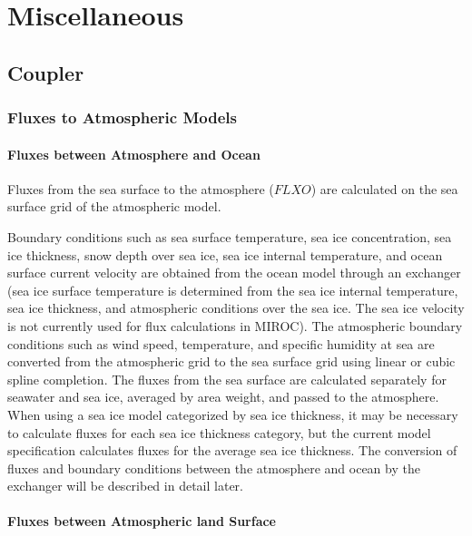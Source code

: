 \hypertarget{miscellaneous}{%
\section{Miscellaneous}\label{miscellaneous}}

\hypertarget{coupler}{%
\subsection{Coupler}\label{coupler}}

\hypertarget{fluxes-to-atmospheric-models}{%
\subsubsection{Fluxes to Atmospheric Models}\label{fluxes-to-atmospheric-models}}

\hypertarget{fluxes-between-atmosphere-and-ocean}{%
\paragraph{Fluxes between Atmosphere and Ocean}\label{fluxes-between-atmosphere-and-ocean}}

Fluxes from the sea surface to the atmosphere (\(FLXO\)) are calculated on the sea surface grid of the atmospheric model.

Boundary conditions such as sea surface temperature, sea ice concentration, sea ice thickness, snow depth over sea ice, sea ice internal temperature, and ocean surface current velocity are obtained
from the ocean model through an exchanger (sea ice surface temperature is determined from the sea ice internal temperature, sea ice thickness, and atmospheric conditions over the sea ice. The sea ice
velocity is not currently used for flux calculations in MIROC). The atmospheric boundary conditions such as wind speed, temperature, and specific humidity at sea are converted from the atmospheric
grid to the sea surface grid using linear or cubic spline completion. The fluxes from the sea surface are calculated separately for seawater and sea ice, averaged by area weight, and passed to the
atmosphere. When using a sea ice model categorized by sea ice thickness, it may be necessary to calculate fluxes for each sea ice thickness category, but the current model specification calculates
fluxes for the average sea ice thickness. The conversion of fluxes and boundary conditions between the atmosphere and ocean by the exchanger will be described in detail later.

\hypertarget{fluxes-between-atmospheric-land-surface}{%
\paragraph{Fluxes between Atmospheric land Surface}\label{fluxes-between-atmospheric-land-surface}}

